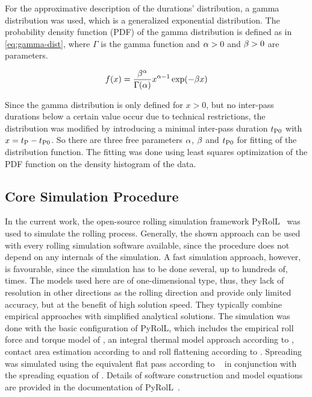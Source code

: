 For the approximative description of the durations' distribution, a gamma distribution was used, which is a generalized exponential distribution.
The probability density function (PDF) of the gamma distribution is defined as in \autoref{eq:gamma-dist}, where $\Gamma$ is the gamma function and ${\alpha} > 0$ and ${\beta} > 0$ are parameters.

\begin{equation}
    f(x) = \frac{{\beta}^{\alpha}}{\Gamma({\alpha})}x^{{\alpha} - 1} \exp(-{\beta} x)
    \label{eq:gamma-dist}
\end{equation}

Since the gamma distribution is only defined for $x>0$, but no inter-pass durations below a certain value occur due to technical restrictions, the distribution was modified by introducing a minimal inter-pass duration ${t_\mathrm{P0}}$ with $x = {t_\mathrm{P}} - {t_\mathrm{P0}}$.
So there are three free parameters ${\alpha}$, ${\beta}$ and ${t_\mathrm{P0}}$ for fitting of the distribution function.
The fitting was done using least squares optimization of the PDF function on the density histogram of the data.

\subsection{Core Simulation Procedure}\label{subsec:simulation-procedure}

In the current work, the open-source rolling simulation framework PyRolL~\cite{pyroll2} was used to simulate the rolling process.
Generally, the shown approach can be used with every rolling simulation software available, since the procedure does not depend on any internals of the simulation.
A fast simulation approach, however, is favourable, since the simulation has to be done several, up to hundreds of, times.
The models used here are of one-dimensional type, thus, they lack of resolution in other directions as the rolling direction and provide only limited accuracy, but at the benefit of high solution speed.
They typically combine empirical approaches with simplified analytical solutions.
The simulation was done with the basic configuration of PyRolL, which includes the empirical roll force and torque model of \textcite{Hensel1978}, an integral thermal model approach according to \textcite{Hensel1990}, contact area estimation according to \textcite{Zouhar1960} and roll flattening according to \textcite{Hitchcock1935}.
Spreading was simulated using the equivalent flat pass according to \citeauthor*{Lendl1948}~\cite{Lendl1948, Lendl1948a, Lendl1949} in conjunction with the spreading equation of \textcite{Wusatowski1969}.
Details of software construction and model equations are provided in the documentation of PyRolL~\cite{pyroll}.



